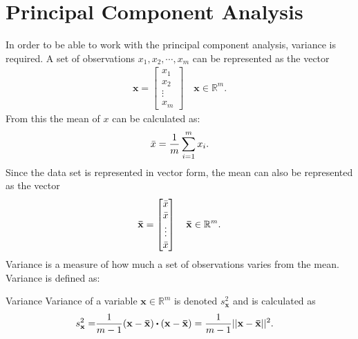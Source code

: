 \chapter{Principal Component Analysis}





In order to be able to work with the principal component analysis, variance is required.
A set of observations $x_1,x_2,\cdots, x_m$ can be represented as the vector
\begin{align*}
    \mathbf{x}=
    \begin{bmatrix}
    x_1\\
    x_2\\
    \vdots\\
    x_m
\end{bmatrix} \quad \textbf{x}\in\mathbb{R}^m.
\end{align*}
From this the mean of $x$ can be calculated as:
\begin{align*}
    \Bar{x}=\frac{1}{m}\sum_{i=1}^mx_i.
\end{align*}
Since the data set is represented in vector form, the mean can also be represented as the vector
\begin{align*}
\mathbf{\Bar{x}}=
    \begin{bmatrix}
    \Bar{x}\\
    \Bar{x}\\
    \vdots\\
    \Bar{x}\\
    \end{bmatrix}\quad \mathbf{\Bar{x}}\in\mathbb{R}^m.
\end{align*}
Variance is a measure of how much a set of observations varies from the mean. Variance is defined as: 
\begin{definition}{Variance}
Variance of a variable $\textbf{x}\in\mathbb{R}^m$ is denoted $s_\textbf{x}^2$ and is calculated as
\begin{align*}
    s_\textbf{x}^2=&\frac{1}{m-1}(\mathbf{x}-\mathbf{\Bar{x}})\vprik(\mathbf{x}-\mathbf{\Bar{x}})=\frac{1}{m-1}||\mathbf{x}-\mathbf{\Bar{x}}||^2.
\end{align*}
\cite[475]{LiAl}
\end{definition}

